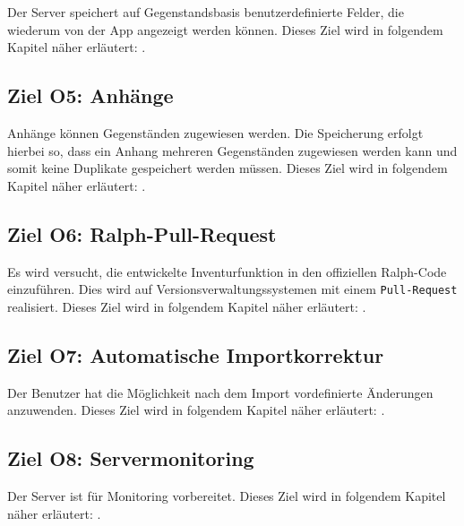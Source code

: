 \documentclass[
    headings=optiontotocandhead,%
    twoside,
    numbers=noenddot,%
    toc=flat, %
    12pt, %
    titlepage, %
    parskip=full, %
    listof=totoc, %
    listof=flat, %
    numbers=noenddot, %
    bibliography=totoc, %
    a4paper,DIV=14,
    BCOR=15mm,
]{scrbook}
\begin{document}
  Der Server speichert auf Gegenstandsbasis benutzerdefinierte Felder, die wiederum von der App angezeigt werden können.
  Dieses Ziel wird in folgendem Kapitel näher erläutert: .



  \subsection*{Ziel O5: Anhänge}

  Anhänge können Gegenständen zugewiesen werden. Die Speicherung erfolgt hierbei so, dass ein Anhang mehreren Gegenständen zugewiesen werden kann und somit keine Duplikate gespeichert werden müssen.
  Dieses Ziel wird in folgendem Kapitel näher erläutert: .



  \subsection*{Ziel O6: Ralph-Pull-Request}

  Es wird versucht, die entwickelte Inventurfunktion in den offiziellen Ralph-Code einzuführen. Dies wird auf Versionsverwaltungssystemen mit einem \texttt{Pull-Request} realisiert.
  Dieses Ziel wird in folgendem Kapitel näher erläutert: .



  \subsection*{Ziel O7: Automatische Importkorrektur}

  Der Benutzer hat die Möglichkeit nach dem Import vordefinierte Änderungen anzuwenden.
  Dieses Ziel wird in folgendem Kapitel näher erläutert: .




  \subsection*{Ziel O8: Servermonitoring}

  Der Server ist für Monitoring vorbereitet.
  Dieses Ziel wird in folgendem Kapitel näher erläutert: .

\end{document}
